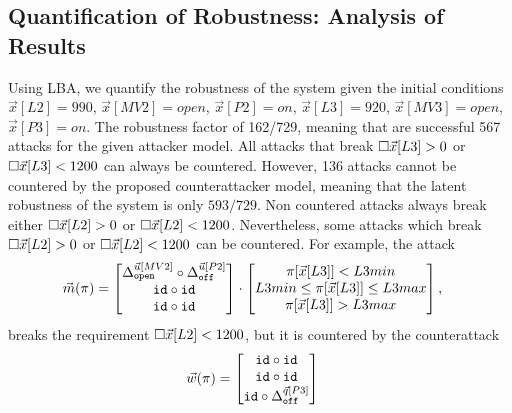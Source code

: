 {\subsection{Quantification of Robustness: Analysis of Results}
Using LBA, we quantify the robustness of the system given the initial conditions $\vec{x}[L2]=990$, $\vec{x}[MV2]=open$, $\vec{x}[P2]=on$, $\vec{x}[L3]=920$, $\vec{x}[MV3]=open$, $\vec{x}[P3]=on$. The robustness factor of 162/729, meaning that are successful 567 attacks for the given attacker model. All attacks that break ${{\square}}{\vec{x}[L3]>0}$ or ${{\square}}{\vec{x}[L3]<1200}$ can always be countered. However, 136 attacks cannot be countered by the proposed counterattacker model, meaning that the latent robustness of the system is only $593/729$. Non countered attacks always break either ${{\square}}{\vec{x}[L2]>0}$ or ${{\square}}{\vec{x}[L2]<1200}$. Nevertheless, some attacks which break ${{\square}}{\vec{x}[L2]>0}$ or ${{\square}}{\vec{x}[L2]<1200}$ can be countered. For example, the attack
\begin{align*}
  \vec{m}(\pi)&=
  \begin{bmatrix}
   {\Delta}^{\vec{u}[MV2]}_{\texttt{open}}\circ {\Delta}^{\vec{u}[P2]}_{\texttt{off}} \\
   {\texttt{id}}\circ {\texttt{id}} \\
   {\texttt{id}}\circ {\texttt{id}} \\
  \end{bmatrix}
  \cdot
  \begin{bmatrix}
    \pi[\vec{x}[L3]]<L3min \\
    L3min \leq \pi[\vec{x}[L3]]\leq L3max \\
    \pi[\vec{x}[L3]]>L3max
  \end{bmatrix},
\end{align*} 
breaks the requirement ${{\square}}{\vec{x}[L2]<1200}$, but it is countered by the counterattack 
\begin{align*}
  \vec{w}(\pi)&=
  \begin{bmatrix}
    {\texttt{id}}\circ {\texttt{id}} \\
    {\texttt{id}}\circ {\texttt{id}} \\
    {\texttt{id}}\circ {\Delta}^{\vec{q}[P3]}_{\texttt{off}} \\

\end{bmatrix}
\end{align*}}
